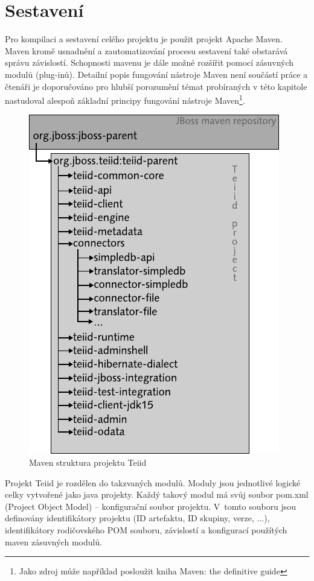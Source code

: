 \documentclass[oneside,12pt]{fithesis2}
\begin{document}
\section{Sestavení}
\label{sestaveni}
Pro kompilaci a sestavení celého projektu je použit projekt Apache Maven. Maven kromě usnadnění a zautomatizování procesu sestavení také obstarává správu závislostí. Schopnosti mavenu je dále možné rozšířit pomocí zásuvných modulů (plug-inů). Detailní popis fungování nástroje Maven není součástí práce a čtenáři je doporučováno pro hlubší porozumění témat probíraných v této kapitole nastudoval alespoň základní principy fungování nástroje Maven\footnote{Jako zdroj může například posloužit kniha Maven: the definitive guide\cite{maven}}.
\begin{figure}[h]
 \centering
 \includegraphics[scale=1]{mavenStructure}
 \caption{Maven struktura projektu Teiid}
\end{figure}

Projekt Teiid je rozdělen do takzvaných modulů. Moduly jsou jednotlivé logické celky vytvořené jako java projekty. Každý takový modul má svůj soubor pom.xml (Project Object Model) -- konfigurační soubor projektu. V~tomto souboru jsou definovány identifikátory projektu (ID artefaktu, ID skupiny, verze, ...), identifikátory rodičovského POM souboru, závislostí a konfigurací použítých maven zásuvných modulů.
\end{document}
